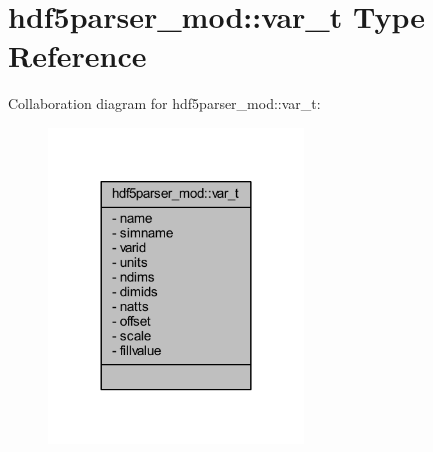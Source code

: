 \hypertarget{structhdf5parser__mod_1_1var__t}{}\section{hdf5parser\+\_\+mod\+:\+:var\+\_\+t Type Reference}
\label{structhdf5parser__mod_1_1var__t}


Collaboration diagram for hdf5parser\+\_\+mod\+:\+:var\+\_\+t\+:\nopagebreak
\begin{figure}[H]
\begin{center}
\leavevmode
\includegraphics[width=192pt]{structhdf5parser__mod_1_1var__t__coll__graph}
\end{center}
\end{figure}

